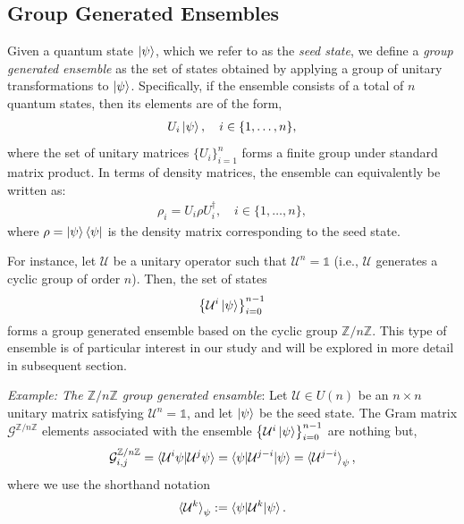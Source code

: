 \documentclass[12pt,letterpaper]{article}
\begin{document}
\begin{multicols}{2}
\subsection{Group Generated Ensembles}

Given a quantum state $\ket{\psi}$, which we refer to as the \emph{seed state}, we define a \emph{group generated ensemble} as the set of states obtained by applying a group of unitary transformations to $\ket{\psi}$. Specifically, if the ensemble consists of a total of $n$ quantum states, then its elements are of the form,
\begin{align*}
	U_i\ket{\psi}, \quad i \in \{1, \dots, n\},
\end{align*}
where the set of unitary matrices $\{U_i\}_{i=1}^n$ forms a finite group under standard matrix product. In terms of density matrices, the ensemble can equivalently be written as:
\begin{align*}
	\rho_i = U_i \rho U_i^\dagger, \quad i \in \{1, \dots, n\},
\end{align*}
where $\rho = \ket{\psi}\bra{\psi}$ is the density matrix corresponding to the seed state.

For instance, let $\mathcal{U}$ be a unitary operator such that $\mathcal{U}^n = \mathds{1}$ (i.e., $\mathcal{U}$ generates a cyclic group of order $n$). Then, the set of states
\begin{align*}
	\left\{ \mathcal{U}^i\ket{\psi} \right\}_{i=0}^{n-1}
\end{align*}
forms a group generated ensemble based on the cyclic group $\mathbb{Z}/n\mathbb{Z}$. This type of ensemble is of particular interest in our study and will be explored in more detail in subsequent section.

\emph{Example: The $\mathbb{Z}/n\mathbb{Z}$ group generated ensamble}: Let $\mathcal{U} \in U(n)$ be an $n \times n$ unitary matrix satisfying $\mathcal{U}^n = \mathds{1}$, and let $\ket{\psi}$ be the seed state. The Gram matrix $\mathcal{G}^{\mathbb{Z}/n\mathbb{Z}}$ elements associated with the ensemble $\left\{\mathcal{U}^i\ket{\psi}\right\}_{i=0}^{n-1}$ are nothing but,
\begin{align*}
	\mathcal{G}^{\mathbb{Z}/n\mathbb{Z}}_{i,j} = \braket{\mathcal{U}^i\psi | \mathcal{U}^j\psi} = \braket{\psi | \mathcal{U}^{j-i} | \psi} = \braket{\mathcal{U}^{j-i}}_{\psi},
\end{align*}
where we use the shorthand notation
\begin{align*}
	\braket{\mathcal{U}^k}_\psi := \braket{\psi | \mathcal{U}^k | \psi}.
\end{align*}


\end{multicols}
\end{document}
